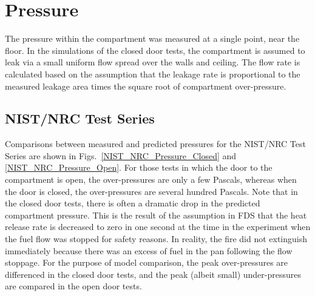 \chapter{Pressure}

The pressure within the compartment was measured at a single point, near the floor.
In the simulations of the closed door tests, the compartment is assumed to leak via a small uniform flow spread
over the walls and ceiling.  The flow rate is calculated based on the assumption that the leakage rate is proportional
to the measured leakage area times the square root of compartment over-pressure.


\section{NIST/NRC Test Series}

Comparisons between measured and predicted pressures for the NIST/NRC Test Series are shown
in Figs.~\ref{NIST_NRC_Pressure_Closed} and \ref{NIST_NRC_Pressure_Open}.
For those tests in which the door to the compartment is
open, the over-pressures are only a few Pascals, whereas when the door is closed, the over-pressures are several hundred Pascals.
Note that in the closed door tests, there is often a dramatic drop in the predicted compartment pressure.
This is the result of the assumption in FDS that the heat release rate is decreased to zero in one second at the time
in the experiment when the fuel flow was stopped for safety reasons.  In reality, the fire did not extinguish
immediately because there was an excess of fuel in the pan following the flow stoppage.
For the purpose of model comparison, the peak over-pressures are differenced in the closed door tests,
and the peak (albeit small) under-pressures are compared in the open door tests.



